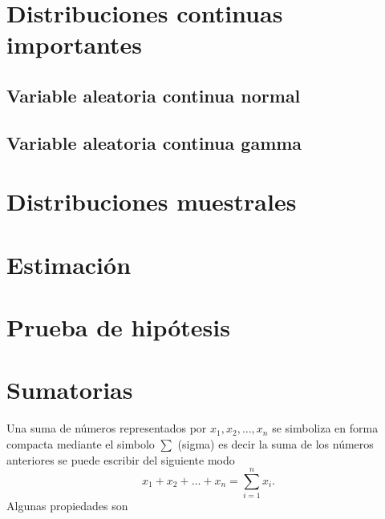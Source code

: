 \documentclass[10pt,]{krantz}
\theoremstyle{definition}
\theoremstyle{definition}
\theoremstyle{definition}
\theoremstyle{definition}
\theoremstyle{remark}
\begin{document}
\hypertarget{distribuciones-continuas-importantes}{%
\chapter{Distribuciones continuas importantes}\label{distribuciones-continuas-importantes}}

\hypertarget{variable-aleatoria-continua-normal}{%
\section{Variable aleatoria continua normal}\label{variable-aleatoria-continua-normal}}

\hypertarget{variable-aleatoria-continua-gamma}{%
\section{Variable aleatoria continua gamma}\label{variable-aleatoria-continua-gamma}}

\hypertarget{distribuciones-muestrales}{%
\chapter{Distribuciones muestrales}\label{distribuciones-muestrales}}

\hypertarget{estimaciuxf3n}{%
\chapter{Estimación}\label{estimaciuxf3n}}

\hypertarget{prueba-de-hipuxf3tesis}{%
\chapter{Prueba de hipótesis}\label{prueba-de-hipuxf3tesis}}

\hypertarget{appendix-apendice}{%
\appendix {}}


\hypertarget{sumatorias}{%
\chapter{Sumatorias}\label{sumatorias}}

Una suma de números representados por \(x_1, x_2, \ldots, x_n\) se simboliza en forma compacta mediante el simbolo \(\sum\) (sigma) es decir la suma de los números anteriores se puede escribir del siguiente modo \[x_1+x_2+\dots+x_n=\sum_{i=1}^nx_i.\]
Algunas propiedades son
\end{document}
